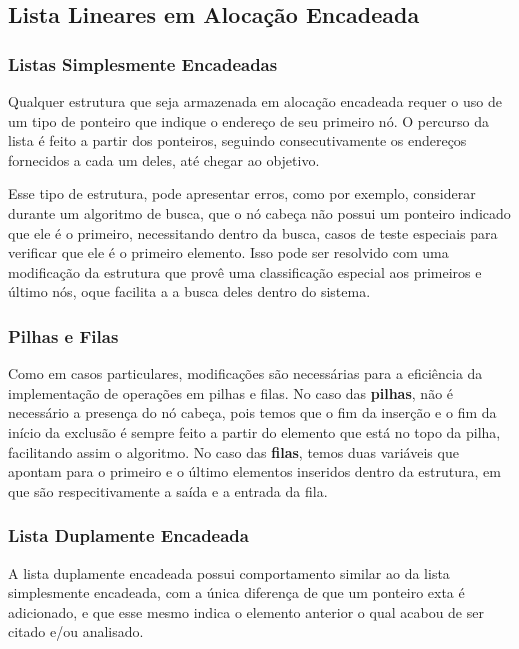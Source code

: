 \documentclass[12pt, a4paper]{paper}
\begin{document}
  \subsection{Lista Lineares em Alocação Encadeada} %
  \label{sub:Lista Lineares em Alocação Encadeada}


    \subsubsection{Listas Simplesmente Encadeadas} %
    \label{sec:Listas Simplesmente Encadeadas}
    Qualquer estrutura que seja armazenada em alocação encadeada requer o uso de 
    um tipo de ponteiro que indique o endereço de seu primeiro nó. O percurso da lista
    é feito a partir dos ponteiros, seguindo consecutivamente os endereços fornecidos 
    a cada um deles, até chegar ao objetivo. 

    Esse tipo de estrutura, pode apresentar erros, como por exemplo, considerar durante 
    um algoritmo de busca, que o nó cabeça não possui um ponteiro indicado que ele é 
    o primeiro, necessitando dentro da busca, casos de teste especiais para verificar 
    que ele é o primeiro elemento. Isso pode ser resolvido com uma modificação da 
    estrutura que provê uma classificação especial aos primeiros e último nós, oque 
    facilita a a busca deles dentro do sistema. 


    \subsubsection{Pilhas e Filas} %
    \label{sec:Pilhas e Filas}
    Como em casos particulares, modificações são necessárias para a eficiência da 
    implementação de operações em pilhas e filas. No caso das \textbf{pilhas}, não é 
    necessário a presença do nó cabeça, pois temos que o fim da inserção e o fim 
    da início da exclusão é sempre feito a partir do elemento que está no topo 
    da pilha, facilitando assim o algoritmo. No caso das \textbf{filas}, temos duas 
    variáveis que apontam para o primeiro e o último elementos inseridos dentro da 
    estrutura, em que são respecitivamente a saída e a entrada da fila.

    \subsubsection{Lista Duplamente Encadeada} %
    \label{sec:Lista Duplamente Encadeada}
    A lista duplamente encadeada possui comportamento similar ao da lista simplesmente 
    encadeada, com a única diferença de que um ponteiro exta é adicionado, e que esse 
    mesmo indica o elemento anterior o qual acabou de ser citado e/ou analisado. 
\end{document}
